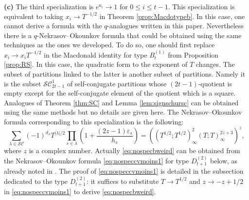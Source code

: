 \documentclass[11pt,letterpaper]{amsart}
\def\ccsc{\mathcal {SC}}
\DeclareMathOperator{\Id}{Id}
\numberwithin{equation}{section}
\numberwithin{df}{section}
\begin{document}
\textbf{(c)} The third specialization is $e^{a_i}\to 1$ for $0\leq i\leq t-1$. This specialization is equivalent to taking $x_i\to T^{-1/2}$ in Theorem \ref{prop:Macdotypeb}. In this case, one cannot derive a formula with the $q$-analogues written in this paper. Nevertheless there is a $q$-Nekrasov--Okounkov formula that could be obtained using the same techniques as the ones we developed. To do so, one should first replace $x_i\to x_iT^{-1/2}$ in the Macdonald identity for type $B^{(1)}_{t}$ from Proposition \ref{prop:RS}. In this case, the quadratic form to the exponent of $T$ changes. The subset of partitions linked to the latter is another subset of partitions. Namely it is the subset $\ccsc_{2t-1}^{1}$ of self-conjugate partitions whose $(2t-1)$-quotient is empty except for the self-conjugate element of the quotient which is a square. Analogues of Theorem \ref{thm:SC} and Lemma \ref{lem:signschursc} can be obtained using the same methods but no details are given here. 
The Nekrasov--Okounkov formula corresponding to this specialization is the following:
 \begin{equation}\label{eq:nospecbweird}
\sum_{\lambda\in\ccsc}(-1)^{d_\lambda}T^{\lvert \lambda\rvert/2}\prod_{s\in\lambda}\left(1+\frac{(2z-1)\varepsilon_s}{h_s}\right)=\left(\left(T^{1/2};T^{1/2}\right)_{\infty}^{2}\left(T;T\right)_{\infty}^{2z+3}\right)^{z},
\end{equation}
where $z$ is a complex number.
Actually \eqref{eq:nospecbweird} can be obtained from the Nekrasov--Okounkov formula \eqref{eq:nospeccvmoins1} for type $D^{(2)}_{t+1}$ below, as already noted in \cite[Theorem $3.33$]{MP}. The proof of \eqref{eq:nospeccvmoins1} is detailed in the subsection dedicated to the type $D^{(2)}_{t+1}$: it suffices to substitute $T\to T^{1/2}$ and $z\to -z+1/2$ in \eqref{eq:nospeccvmoins1} to derive \eqref{eq:nospecbweird}.



%
%
\end{document}
